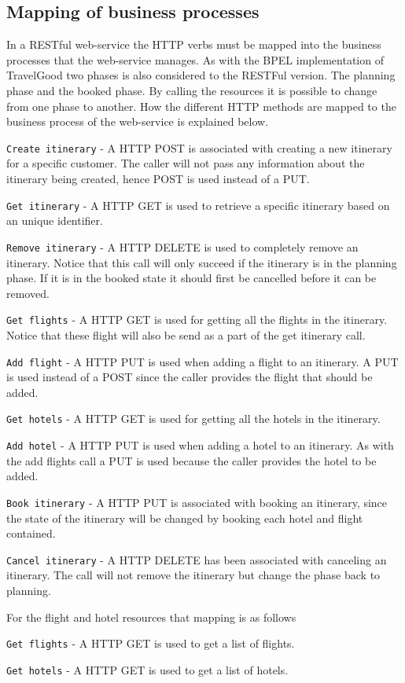 \subsection{Mapping of business processes}
In a RESTful web-service the HTTP verbs must be mapped into the business processes that the web-service manages. As with the BPEL implementation of TravelGood two phases is also considered to the RESTFul version. The planning phase and the booked phase. By calling the resources it is possible to change from one phase to another. How the different HTTP methods are mapped to the business process of the web-service is explained below.
\begin{description}
	\item \texttt{Create itinerary} - A HTTP POST is associated with creating a new itinerary for a specific customer. The caller will not pass any information about the itinerary being created, hence POST is used instead of a PUT. 
	\item \texttt{Get itinerary} - A HTTP GET is used to retrieve a specific itinerary based on an unique identifier.
	\item \texttt{Remove itinerary} - A HTTP DELETE is used to completely remove an itinerary. Notice that this call will only succeed if the itinerary is in the planning phase. If it is in the booked state it should first be cancelled before it can be removed.
	\item \texttt{Get flights} - A HTTP GET is used for getting all the flights in the itinerary. Notice that these flight will also be send as a part of the get itinerary call.
	\item \texttt{Add flight} - A HTTP PUT is used when adding a flight to an itinerary. A PUT is used instead of a POST since the caller provides the flight that should be added.
	\item \texttt{Get hotels} -  A HTTP GET is used for getting all the hotels in the itinerary.
	\item \texttt{Add hotel} - A HTTP PUT is used when adding a hotel to an itinerary. As with the add flights call a PUT is used because the caller provides the hotel to be added.
	\item \texttt{Book itinerary} - A HTTP PUT is associated with booking an itinerary, since the state of the itinerary will be changed by booking each hotel and flight contained.
	\item \texttt{Cancel itinerary} - A HTTP DELETE has been associated with canceling an itinerary. The call will not remove the itinerary but change the phase back to planning.
\end{description}
For the flight and hotel resources that mapping is as follows
\begin{description}
	\item \texttt{Get flights} - A HTTP GET is used to get a list of flights.
	\item \texttt{Get hotels} - A HTTP GET is used to get a list of hotels.	
\end{description}

